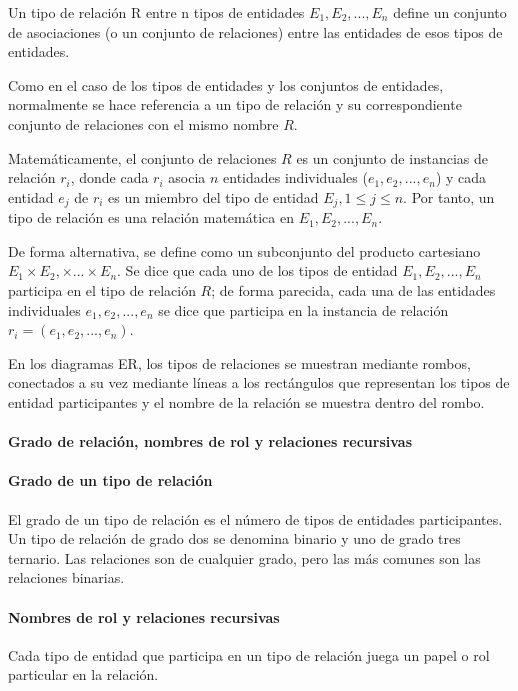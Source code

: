 Un tipo de relación R entre n tipos de entidades $E_1, E_2, ..., E_n$ define un conjunto de asociaciones (o un conjunto de relaciones) entre las entidades de esos tipos de entidades. 


Como en el caso de los tipos de entidades y los conjuntos de entidades, normalmente se hace referencia a un tipo de relación y su correspondiente conjunto de relaciones con el mismo nombre $R$.


Matemáticamente, el conjunto de relaciones $R$ es un conjunto de instancias de relación $r_i$, donde cada $r_i$ asocia $n$ entidades individuales ($e_1, e_2,..., e_n$) y cada entidad $e_j$ de $r_i$ es un miembro del tipo de entidad $E_j, 1 \leq j \leq n$. Por tanto, un tipo de relación es una relación matemática en $E_1, E_2,..., E_n$.


De forma alternativa, se define como un subconjunto del producto cartesiano $E_1 \times E_2,\times ... 	\times E_n$. Se dice que cada uno de los tipos de entidad $E_1, E_2,..., E_n$ participa en el tipo de relación $R$; de forma parecida, cada una de las entidades individuales $e_1, e_2,..., e_n$ se dice que participa en la instancia de relación $r_i = (e_1, e_2,..., e_n)$.


En los diagramas ER, los tipos de relaciones se muestran mediante rombos, conectados a su vez mediante líneas a los rectángulos que representan los tipos de entidad participantes y el nombre de la relación se muestra dentro del rombo.


\paragraph*{Grado de relación, nombres de rol y relaciones recursivas}
\paragraph*{Grado de un tipo de relación}
El grado de un tipo de relación es el número de tipos de entidades participantes. Un tipo de relación de grado dos se denomina binario y uno de grado tres ternario. Las relaciones son de cualquier grado, pero las más comunes son las relaciones binarias.

\paragraph*{Nombres de rol y relaciones recursivas}
Cada tipo de entidad que participa en un tipo de relación juega un papel o rol particular en la relación.


